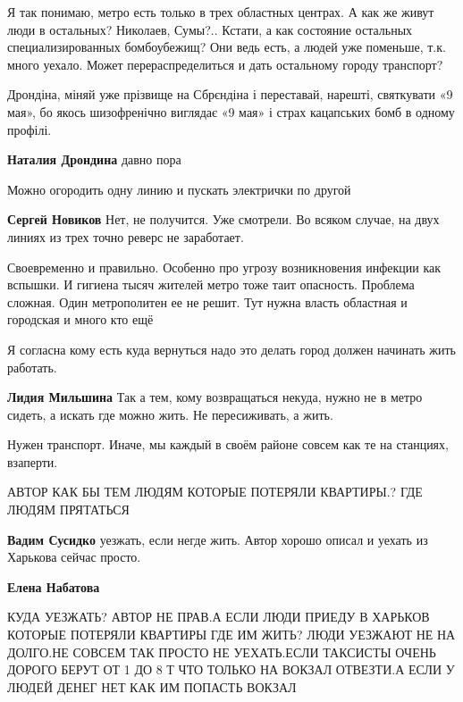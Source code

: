 \begin{itemize}
\begin{itemize}
Я так понимаю, метро есть только в трех областных центрах. А как же живут люди
в остальных? Николаев, Сумы?.. Кстати, а как состояние остальных
специализированных бомбоубежищ? Они ведь есть, а людей уже поменьше, т.к. много
уехало. Может перераспределиться и дать остальному городу транспорт?


Дрондіна, міняй уже прізвище на Сбрєндіна і переставай, нарешті, святкувати «9
мая», бо якось шизофренічно виглядає «9 мая» і страх кацапських бомб в одному
профілі.

\textbf{Наталия Дрондина} давно пора

\end{itemize} %

Можно огородить одну линию и пускать электрички по другой

\textbf{Сергей Новиков} Нет, не получится. Уже смотрели. Во всяком случае, на двух линиях из трех точно реверс не заработает.


Своевременно и правильно. Особенно про угрозу возникновения инфекции как
вспышки. И гигиена тысяч жителей метро тоже таит опасность. Проблема сложная.
Один метрополитен ее не решит. Тут нужна власть областная и городская и много
кто ещё


Я согласна кому есть куда вернуться надо это делать город должен начинать жить
работать.

\textbf{Лидия Мильшина} Так а тем, кому возвращаться некуда, нужно не в метро сидеть, а искать где можно жить. Не пересиживать, а жить.

Нужен транспорт. Иначе, мы каждый в своём районе совсем как те на станциях, взаперти.

АВТОР КАК БЫ ТЕМ ЛЮДЯМ КОТОРЫЕ ПОТЕРЯЛИ КВАРТИРЫ.? ГДЕ ЛЮДЯМ ПРЯТАТЬСЯ

\begin{itemize} %
\textbf{Вадим Сусидко} уезжать, если негде жить. Автор хорошо описал и уехать из Харькова сейчас просто.

\textbf{Елена Набатова} 

КУДА УЕЗЖАТЬ? АВТОР НЕ ПРАВ.А ЕСЛИ ЛЮДИ ПРИЕДУ В ХАРЬКОВ КОТОРЫЕ ПОТЕРЯЛИ
КВАРТИРЫ ГДЕ ИМ ЖИТЬ? ЛЮДИ УЕЗЖАЮТ НЕ НА ДОЛГО.НЕ СОВСЕМ ТАК ПРОСТО НЕ
УЕХАТЬ.ЕСЛИ ТАКСИСТЫ ОЧЕНЬ ДОРОГО БЕРУТ ОТ 1 ДО 8 Т ЧТО ТОЛЬКО НА ВОКЗАЛ
ОТВЕЗТИ.А ЕСЛИ У ЛЮДЕЙ ДЕНЕГ НЕТ КАК ИМ ПОПАСТЬ ВОКЗАЛ


\end{itemize}
\end{itemize}

